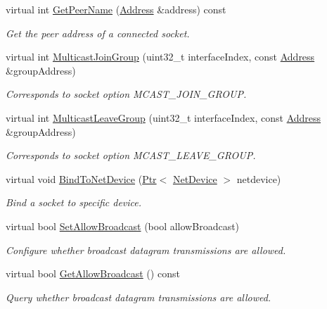 \begin{DoxyCompactItemize}
virtual int \hyperlink{classns3_1_1UdpSocketImpl_a73c3d2b1f7372550df82af8effb8bbe0}{Get\+Peer\+Name} (\hyperlink{classns3_1_1Address}{Address} \&address) const 
\begin{DoxyCompactList}\small\item\em Get the peer address of a connected socket. \end{DoxyCompactList}\item 
virtual int \hyperlink{classns3_1_1UdpSocketImpl_ae32570783dbdc0fdda43b22c2fbc9d53}{Multicast\+Join\+Group} (uint32\+\_\+t interface\+Index, const \hyperlink{classns3_1_1Address}{Address} \&group\+Address)
\begin{DoxyCompactList}\small\item\em Corresponds to socket option M\+C\+A\+S\+T\+\_\+\+J\+O\+I\+N\+\_\+\+G\+R\+O\+UP. \end{DoxyCompactList}\item 
virtual int \hyperlink{classns3_1_1UdpSocketImpl_a6eed2cfb6cf57309ac25e4526871b432}{Multicast\+Leave\+Group} (uint32\+\_\+t interface\+Index, const \hyperlink{classns3_1_1Address}{Address} \&group\+Address)
\begin{DoxyCompactList}\small\item\em Corresponds to socket option M\+C\+A\+S\+T\+\_\+\+L\+E\+A\+V\+E\+\_\+\+G\+R\+O\+UP. \end{DoxyCompactList}\item 
virtual void \hyperlink{classns3_1_1UdpSocketImpl_a93fa14afedc32353602551df1e5f2d59}{Bind\+To\+Net\+Device} (\hyperlink{classns3_1_1Ptr}{Ptr}$<$ \hyperlink{classns3_1_1NetDevice}{Net\+Device} $>$ netdevice)
\begin{DoxyCompactList}\small\item\em Bind a socket to specific device. \end{DoxyCompactList}\item 
virtual bool \hyperlink{classns3_1_1UdpSocketImpl_a99fd369504ca05485b7be7a426fbb4d5}{Set\+Allow\+Broadcast} (bool allow\+Broadcast)
\begin{DoxyCompactList}\small\item\em Configure whether broadcast datagram transmissions are allowed. \end{DoxyCompactList}\item 
virtual bool \hyperlink{classns3_1_1UdpSocketImpl_a9d2ef36ffe3fe414e861ec14d6d18fed}{Get\+Allow\+Broadcast} () const 
\begin{DoxyCompactList}\small\item\em Query whether broadcast datagram transmissions are allowed. \end{DoxyCompactList}\item 

\end{DoxyCompactItemize}
